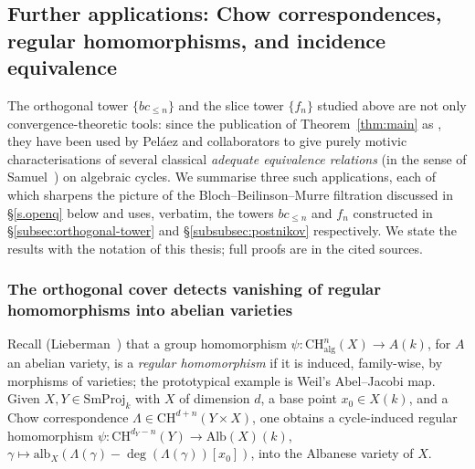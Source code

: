 \documentclass[12pt,a4paper]{article}
\theoremstyle{definition}
\newcommand{\CH}{\mathrm{CH}}
\newcommand{\SmProj}{\mathrm{SmProj}}
\newcommand{\Alb}{\mathrm{Alb}}
\newcommand{\alg}{\mathrm{alg}}
\begin{document}
\subsection{Further applications: Chow correspondences, regular
homomorphisms, and incidence equivalence}
\label{subsec:applications}

The orthogonal tower $\{bc_{\leq n}\}$ and the slice tower $\{f_n\}$ studied
above are not only convergence-theoretic tools: since the publication of
Theorem~\ref{thm:main} as \cite{GalPel22}, they have been used by Peláez and
collaborators to give purely motivic characterisations of several classical
\emph{adequate equivalence relations} (in the sense of Samuel~\cite{Sam60}) on
algebraic cycles.  We summarise three such applications, each of which sharpens
the picture of the Bloch--Beilinson--Murre filtration discussed in
\S\ref{s.openq} below and uses, verbatim, the towers $bc_{\leq n}$ and $f_n$
constructed in \S\ref{subsec:orthogonal-tower} and
\S\ref{subsubsec:postnikov} respectively.  We state the results with the
notation of this thesis; full proofs are in the cited sources.

\subsubsection{The orthogonal cover detects vanishing of regular homomorphisms
into abelian varieties}

Recall (Lieberman~\cite{Lie68}) that a group homomorphism
$\psi:\CH^n_{\alg}(X)\to A(k)$, for $A$ an abelian variety, is a \emph{regular
homomorphism} if it is induced, family-wise, by morphisms of varieties; the
prototypical example is Weil's Abel--Jacobi map.  Given $X,Y\in\SmProj_k$ with
$X$ of dimension $d$, a base point $x_0\in X(k)$, and a Chow correspondence
$\Lambda\in\CH^{d+n}(Y\times X)$, one obtains a cycle-induced regular
homomorphism $\psi:\CH^{d_Y-n}(Y)\to\Alb(X)(k)$,
$\gamma\mapsto\mathrm{alb}_X(\Lambda(\gamma)-\deg(\Lambda(\gamma))[x_0])$, into
the Albanese variety of $X$.
\end{document}
